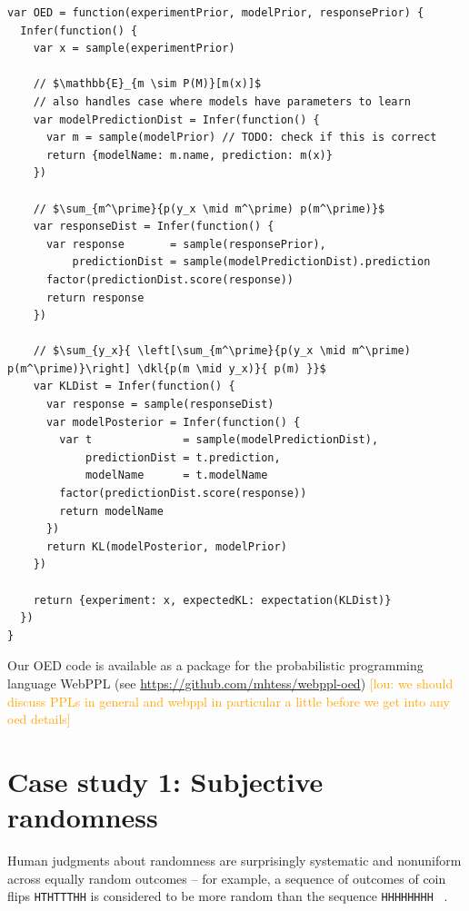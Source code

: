 \documentclass{article}
\newcommand{\dkl}{D_\mathrm{KL}\infdivx}
\newcommand{\lou}[1]{\textcolor{orange}{[lou: #1]}}
\begin{document}
\begin{minipage}{\linewidth}
\begin{lstlisting}[mathescape, label={code:oed-pp}, caption = OED as a probabilistic program]
var OED = function(experimentPrior, modelPrior, responsePrior) {
  Infer(function() {
    var x = sample(experimentPrior)

    // $\mathbb{E}_{m \sim P(M)}[m(x)]$
    // also handles case where models have parameters to learn
    var modelPredictionDist = Infer(function() {
      var m = sample(modelPrior) // TODO: check if this is correct
      return {modelName: m.name, prediction: m(x)}
    })

    // $\sum_{m^\prime}{p(y_x \mid m^\prime) p(m^\prime)}$
    var responseDist = Infer(function() {
      var response       = sample(responsePrior),
          predictionDist = sample(modelPredictionDist).prediction
      factor(predictionDist.score(response))
      return response
    })

    // $\sum_{y_x}{ \left[\sum_{m^\prime}{p(y_x \mid m^\prime) p(m^\prime)}\right] \dkl{p(m \mid y_x)}{ p(m) }}$
    var KLDist = Infer(function() {
      var response = sample(responseDist)
      var modelPosterior = Infer(function() {
        var t              = sample(modelPredictionDist),
            predictionDist = t.prediction,
            modelName      = t.modelName
        factor(predictionDist.score(response))
        return modelName
      })
      return KL(modelPosterior, modelPrior)
    })

    return {experiment: x, expectedKL: expectation(KLDist)}
  })
}
\end{lstlisting}
\end{minipage}

Our OED code is available as a package for the probabilistic programming language WebPPL \cite{dippl} (see  \url{https://github.com/mhtess/webppl-oed})
\lou{we should discuss PPLs in general and webppl in particular a little before we get into any oed details}

\section{Case study 1: Subjective randomness}
\label{s:tutorial}

Human judgments about randomness are surprisingly systematic and nonuniform across equally random outcomes -- for example, a sequence of outcomes of coin flips \lstinline{HTHTTTHH} is considered to be more random than the sequence \lstinline{HHHHHHHH} ~\cite{goodfellow38:jep, griffiths01:cogsci}.
\end{document}
